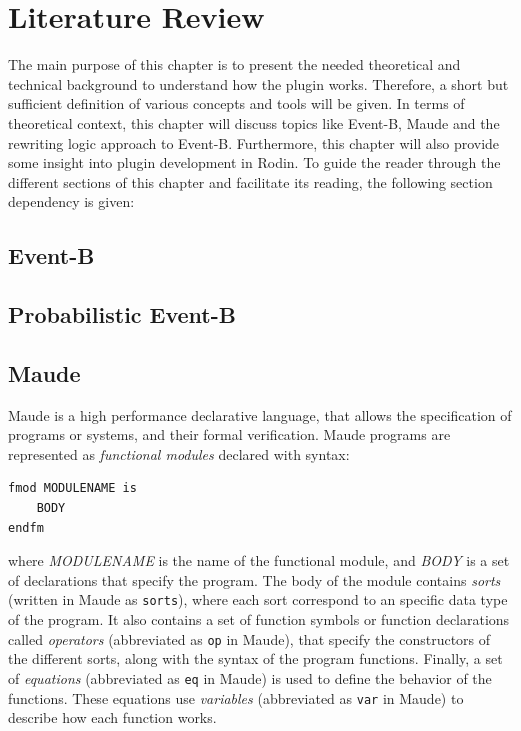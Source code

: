 \chapter{Literature Review}
The main purpose of this chapter is to present the needed theoretical and technical background to understand how the plugin works. Therefore, a short but sufficient definition of various concepts and tools will be given. In terms of theoretical context, this chapter will discuss topics like  Event-B, Maude and the rewriting logic approach to Event-B. Furthermore, this chapter will also provide some insight into plugin development in Rodin. To guide the reader through the different sections of this chapter and facilitate its reading, the following section dependency is given:



\section{Event-B}

\section{Probabilistic Event-B}

\section{Maude}

Maude \cite{MaudeManual, Lecture1, PeterMaude} is a high performance declarative language, that allows the specification of programs or systems, and their formal verification.
Maude programs are represented as \textit{functional modules} declared with syntax:
\begin{lstlisting}
fmod MODULENAME is
    BODY
endfm
\end{lstlisting}
where \textit{MODULENAME} is the name of the functional module, and \textit{BODY} is a set of declarations that specify the program. The body of the module contains \textit{sorts} (written in Maude as \texttt{sorts}), where each sort correspond to an specific data type of the program. It also contains a set of function symbols or function declarations called \textit{operators} (abbreviated as \texttt{op} in Maude), that specify the constructors of the different sorts, along with the syntax of the program functions. Finally, a set of \textit{equations} (abbreviated as \texttt{eq} in Maude) is used to define the behavior of the functions. These equations use \textit{variables} (abbreviated as \texttt{var} in Maude) to describe how each function works. 

